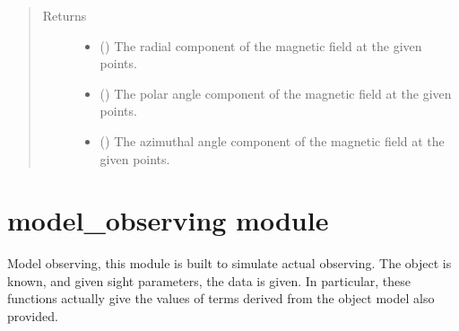 \documentclass[letterpaper,10pt,english]{sphinxmanual}
\begin{document}
\begin{fulllineitems}
\begin{quote}
\begin{description}
\item[{Returns}] \leavevmode
\begin{itemize}
\item {} 
 () \textendash{} The radial component of the magnetic field at the given points.

\item {} 
 () \textendash{} The polar angle component of the magnetic field at the given points.

\item {} 
 () \textendash{} The azimuthal angle component of the magnetic field at the given points.

\end{itemize}


\end{description}\end{quote}

\end{fulllineitems}



\section{model\_observing module}
\label{\detokenize{model_observing:module-model_observing}}\label{\detokenize{model_observing:model-observing-module}}\label{\detokenize{model_observing::doc}}
Model observing, this module is built to simulate actual observing. The
object is known, and given sight parameters, the data is given. In particular,
these functions actually give the values of terms derived from the object
model also provided.
\end{document}
